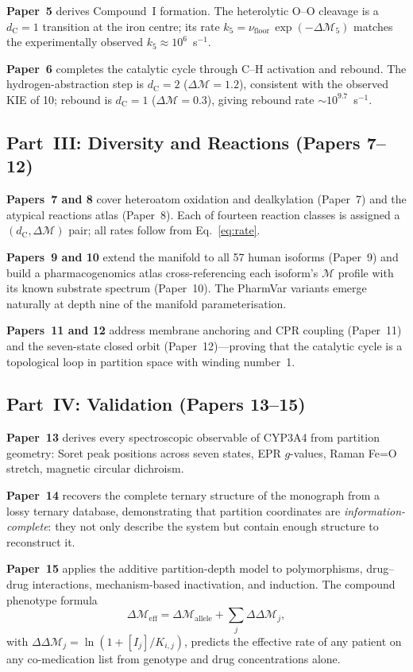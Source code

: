 \documentclass[11pt,twocolumn,a4paper]{article}
\theoremstyle{definition}
\theoremstyle{remark}
\newcommand{\Depth}{\mathcal{M}}
\newcommand{\dC}{d_{\mathrm{C}}}
\newcommand{\nufloor}{\nu_{\mathrm{floor}}}
\begin{document}
\textbf{Paper~5} derives Compound~I formation.  The heterolytic O--O cleavage
is a $\dC = 1$ transition at the iron centre; its rate
$k_5 = \nufloor\,\exp(-\Delta\Depth_5)$ matches the experimentally observed
$k_5 \approx 10^6$~s$^{-1}$.

\textbf{Paper~6} completes the catalytic cycle through C--H activation and
rebound.  The hydrogen-abstraction step is $\dC = 2$ ($\Delta\Depth = 1.2$),
consistent with the observed KIE of 10; rebound is $\dC = 1$
($\Delta\Depth = 0.3$), giving rebound rate $\sim\!10^{9.7}$~s$^{-1}$.

\subsection{Part~III: Diversity and Reactions (Papers 7--12)}

\textbf{Papers~7 and 8} cover heteroatom oxidation and dealkylation
(Paper~7) and the atypical reactions atlas (Paper~8).  Each of fourteen
reaction classes is assigned a $(\dC, \Delta\Depth)$ pair; all rates follow
from Eq.~\eqref{eq:rate}.

\textbf{Papers~9 and 10} extend the manifold to all 57 human isoforms
(Paper~9) and build a pharmacogenomics atlas cross-referencing each isoform's
$\Depth$ profile with its known substrate spectrum (Paper~10).  The PharmVar
variants emerge naturally at depth nine of the manifold parameterisation.

\textbf{Papers~11 and 12} address membrane anchoring and CPR coupling
(Paper~11) and the seven-state closed orbit (Paper~12)---proving that the
catalytic cycle is a topological loop in partition space with winding number~1.

\subsection{Part~IV: Validation (Papers 13--15)}

\textbf{Paper~13} derives every spectroscopic observable of CYP3A4 from
partition geometry: Soret peak positions across seven states, EPR $g$-values,
Raman Fe=O stretch, magnetic circular dichroism.

\textbf{Paper~14} recovers the complete ternary structure of the monograph
from a lossy ternary database, demonstrating that partition coordinates are
\emph{information-complete}: they not only describe the system but contain
enough structure to reconstruct it.

\textbf{Paper~15} applies the additive partition-depth model to polymorphisms,
drug--drug interactions, mechanism-based inactivation, and induction.  The
compound phenotype formula
\begin{equation}
    \Delta\Depth_{\mathrm{eff}} = \Delta\Depth_{\mathrm{allele}}
        + \sum_j \Delta\Delta\Depth_j,
    \label{eq:phenotype}
\end{equation}
with $\Delta\Delta\Depth_j = \ln(1 + [I_j]/K_{i,j})$, predicts the effective
rate of any patient on any co-medication list from genotype and drug
concentrations alone.
\end{document}
